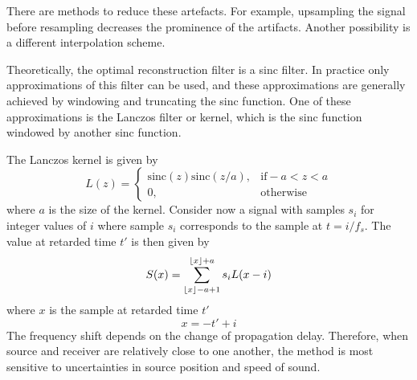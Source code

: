 There are methods to reduce these artefacts. For example, upsampling the signal before resampling decreases the prominence of the artifacts.
Another possibility is a different interpolation scheme.

Theoretically, the optimal reconstruction filter is a sinc filter. In practice
only approximations of this filter can be used, and these approximations are
generally achieved by windowing and truncating the sinc function. One of these
approximations is the Lanczos filter or kernel, which is the sinc function
windowed by another sinc function.

The Lanczos kernel is given by
\begin{equation}
 L(z) = \begin{cases}
         \textrm{sinc}(z) \textrm{sinc}(z/a), & \textrm{if} -a < z < a \\
         0, & \text{otherwise}
        \end{cases}
\end{equation}
where $a$ is the size of the kernel. Consider now a signal with samples $s_i$
for integer values of $i$ where sample $s_i$ corresponds to the sample at $t=i/f_s$.
The value at retarded time $t'$ is then given by
\begin{equation}
 S(x) = \sum_{\lfloor x\rfloor - a + 1}^{\lfloor x\rfloor + a} s_i L(x-i)
\end{equation}
where $x$ is the sample at retarded time $t'$
\begin{equation}
 x = -t' + i
\end{equation}
The frequency shift depends on the change of propagation delay. Therefore, when source and receiver are relatively close to one another, the method is most sensitive to uncertainties in source position and speed of sound.


